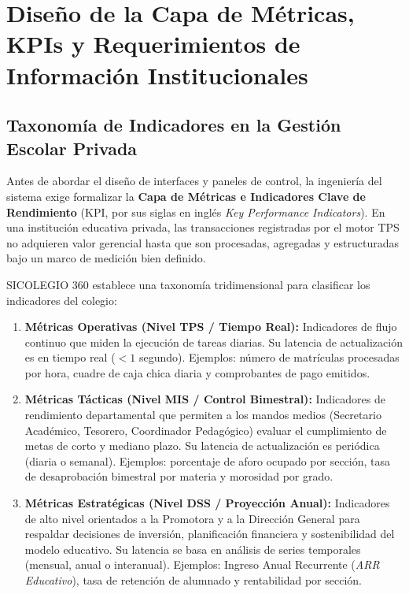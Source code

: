 \documentclass[12pt,a4paper,oneside]{report}
\begin{document}
\chapter{Diseño de la Capa de Métricas, KPIs y Requerimientos de Información Institucionales}

\section{Taxonomía de Indicadores en la Gestión Escolar Privada}

Antes de abordar el diseño de interfaces y paneles de control, la ingeniería del sistema exige formalizar la \textbf{Capa de Métricas e Indicadores Clave de Rendimiento} (KPI, por sus siglas en inglés \textit{Key Performance Indicators}). En una institución educativa privada, las transacciones registradas por el motor TPS no adquieren valor gerencial hasta que son procesadas, agregadas y estructuradas bajo un marco de medición bien definido.

SICOLEGIO 360 establece una taxonomía tridimensional para clasificar los indicadores del colegio:

\begin{enumerate}
    \item \textbf{Métricas Operativas (Nivel TPS / Tiempo Real):} Indicadores de flujo continuo que miden la ejecución de tareas diarias. Su latencia de actualización es en tiempo real ($<1$ segundo). Ejemplos: número de matrículas procesadas por hora, cuadre de caja chica diaria y comprobantes de pago emitidos.
    \item \textbf{Métricas Tácticas (Nivel MIS / Control Bimestral):} Indicadores de rendimiento departamental que permiten a los mandos medios (Secretario Académico, Tesorero, Coordinador Pedagógico) evaluar el cumplimiento de metas de corto y mediano plazo. Su latencia de actualización es periódica (diaria o semanal). Ejemplos: porcentaje de aforo ocupado por sección, tasa de desaprobación bimestral por materia y morosidad por grado.
    \item \textbf{Métricas Estratégicas (Nivel DSS / Proyección Anual):} Indicadores de alto nivel orientados a la Promotora y a la Dirección General para respaldar decisiones de inversión, planificación financiera y sostenibilidad del modelo educativo. Su latencia se basa en análisis de series temporales (mensual, anual o interanual). Ejemplos: Ingreso Anual Recurrente (\textit{ARR Educativo}), tasa de retención de alumnado y rentabilidad por sección.
\end{enumerate}
\end{document}

